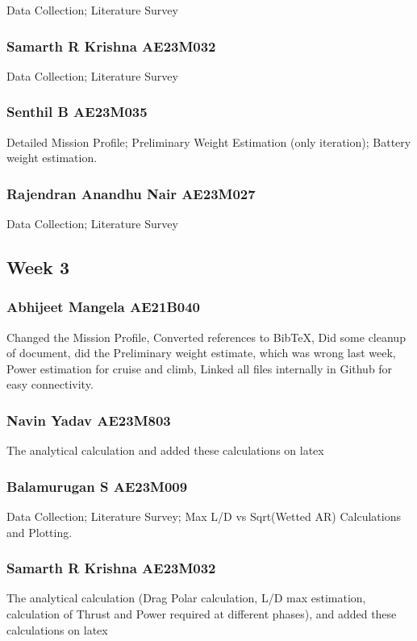 \documentclass[12 pt]{article}
\begin{document}
Data Collection; Literature Survey

\subsubsection{Samarth R Krishna AE23M032}

Data Collection; Literature Survey

\subsubsection{Senthil B AE23M035}

Detailed Mission Profile; Preliminary Weight Estimation (only iteration); Battery weight estimation.

\subsubsection{Rajendran Anandhu Nair AE23M027}

Data Collection; Literature Survey




\subsection{Week 3}


\subsubsection{Abhijeet Mangela AE21B040}
Changed the Mission Profile, Converted references to BibTeX, Did some cleanup of document, did the Preliminary weight estimate, which was wrong last week, Power estimation for cruise and climb, Linked all files internally in Github for easy connectivity.

\subsubsection{Navin Yadav AE23M803}
The analytical calculation and added these calculations on latex 

\subsubsection{Balamurugan S AE23M009}
Data Collection; Literature Survey; Max L/D vs Sqrt(Wetted AR) Calculations and Plotting.


\subsubsection{Samarth R Krishna AE23M032}
The analytical calculation (Drag Polar calculation, L/D max estimation, calculation of Thrust and Power required at different phases), and added these calculations on latex
\end{document}
